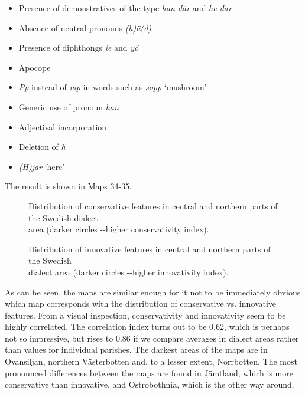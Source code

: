 \begin{itemize}
\item 

Presence of demonstratives of the type\textit{ han där} and \textit{he där}

\item 

Absence of neutral pronouns \textit{(h)ä(d)}

\item 

Presence of diphthongs \textit{ie} and \textit{yö}

\item 

Apocope

\item 

\textit{Pp} instead of \textit{mp }in words such as \textit{sopp} ‘mushroom’

\item 

Generic use of pronoun \textit{han}

\item 

Adjectival incorporation

\item 

Deletion of \textit{h}

\item 

\textit{(H)jär} ‘here’

\end{itemize}

The result is shown in Maps 34-35. 


\begin{figure}[h]
\caption{Distribution of conservative features in central and northern parts of the Swedish dialect\\
 area (darker circles -{}-higher conservativity index). }
\label{map:6:34}
\end{figure}


\begin{figure}[h]
\caption{Distribution of innovative features in central and northern parts of the Swedish\\
 dialect area (darker circles -{}-higher innovativity index). }
\label{map:6:35}
\end{figure}
 
 
As can be seen, the maps are similar enough for it not to be immediately obvious which map corresponds with the distribution of conservative vs. innovative features. From a visual inspection, conservativity and innovativity seem to be highly correlated. The correlation index turns out to be 0.62, which is perhaps not so impressive, but rises to 0.86 if we compare averages in dialect areas rather than values for individual parishes. The darkest areas of the maps are in Ovansiljan, northern Västerbotten and, to a lesser extent, Norrbotten. The most pronounced differences between the maps are found in Jämtland, which is more conservative than innovative, and Ostrobothnia, which is the other way around. 




